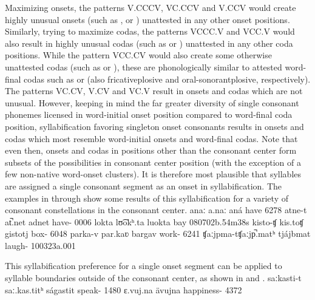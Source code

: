 Maximizing onsets, the patterns V.CCCV, VC.CCV and V.CCV would create highly unusual onsets (such as ,  or ) unattested in any other onset positions. 
Similarly, trying to maximize codas, the patterns VCCC.V and VCC.V would also result in highly unusual codas (such as  or ) unattested in any other coda positions. 
While the pattern VCC.CV would also create some otherwise unattested codas (such as  or ), these are phonologically similar to attested word-final codas such as  or  (also fricative\PLUS plosive and oral-sonorant\PLUS plosive, respectively). 
The patterns VC.CV, V.CV and VC.V result in onsets and codas which are not unusual. However, keeping in mind the far greater diversity of single consonant phonemes licensed in word-initial onset position compared to word-final coda position, syllabification favoring singleton onset consonants results in onsets and codas which most resemble word-initial onsets and word-final codas. Note that even then, onsets and codas in positions other than the consonant center form subsets of the possibilities in consonant center position (with the exception of a few non-native word-onset clusters). It is therefore most plausible that syllables are assigned a single consonant segment as an onset in syllabification. The examples in  through  %
show some results of this syllabification for a variety of consonant constellations in the consonant center.
	{anaː}	{a.naː}		{aná}	{have\BS{}}	{6278}
		{atne-t}	{at̚.net}		{adnet}	{have-}	{0006}
		{lokta}	{lʊ͡okʰ.ta}		{luokta}	{bay\BS{}}	{080702b}{.54m38s}
			{kisto-ʧ}	{kis.toʧ}		{gistotj}	{box-}		{6048}
	{parka-v}	{par.kaʋ}		{bargav}	{work-}	{6241}
		{ʧaːjpma-t}{ʧaːjp̚.matʰ}	{tjájbmat}	{laugh-}		{100323a}{.001}

This syllabification preference for a single onset segment can be applied to syllable boundaries outside of the consonant center, as shown in  and . 
		{saːkasti-t}	{saː.kas.titʰ}	{ságastit}	{speak-}			{1480}
	{ɛ.vuj.na}		{ävujna}	{happiness-}	{4372}

